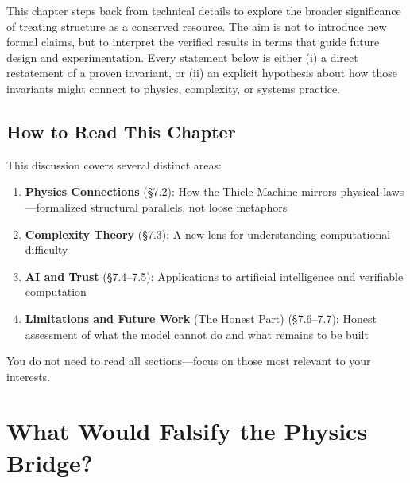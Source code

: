 This chapter steps back from technical details to explore the broader significance of treating structure as a conserved resource. The aim is not to introduce new formal claims, but to interpret the verified results in terms that guide future design and experimentation. Every statement below is either (i) a direct restatement of a proven invariant, or (ii) an explicit hypothesis about how those invariants might connect to physics, complexity, or systems practice.

\subsection{How to Read This Chapter}

This discussion covers several distinct areas:
\begin{enumerate}
    \item \textbf{Physics Connections} (§7.2): How the Thiele Machine mirrors physical laws---formalized structural parallels, not loose metaphors
    \item \textbf{Complexity Theory} (§7.3): A new lens for understanding computational difficulty
    \item \textbf{AI and Trust} (§7.4--7.5): Applications to artificial intelligence and verifiable computation
    \item \textbf{Limitations and Future Work} (The Honest Part) (§7.6--7.7): Honest assessment of what the model cannot do and what remains to be built
\end{enumerate}

You do not need to read all sections---focus on those most relevant to your interests.

\section{What Would Falsify the Physics Bridge?}

